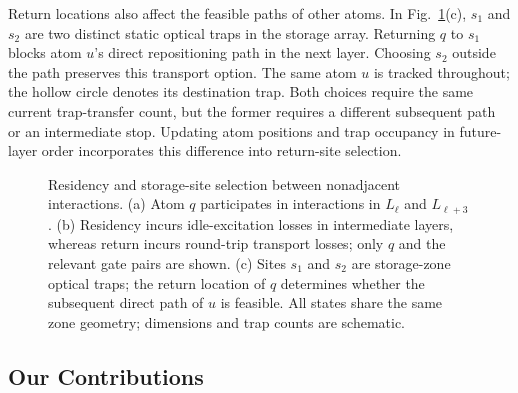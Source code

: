 Return locations also affect the feasible paths of other atoms. In Fig.~\ref{fig:baseline-motivation}(c), $s_1$ and $s_2$ are two distinct static optical traps in the storage array. Returning $q$ to $s_1$ blocks atom $u$'s direct repositioning path in the next layer. Choosing $s_2$ outside the path preserves this transport option. The same atom $u$ is tracked throughout; the hollow circle denotes its destination trap. Both choices require the same current trap-transfer count, but the former requires a different subsequent path or an intermediate stop. Updating atom positions and trap occupancy in future-layer order incorporates this difference into return-site selection.

\begin{figure}[t]
  \centering
  \resizebox{\textwidth}{!}{}
  \caption{Residency and storage-site selection between nonadjacent interactions. (a) Atom $q$ participates in interactions in $L_\ell$ and $L_{\ell+3}$. (b) Residency incurs idle-excitation losses in intermediate layers, whereas return incurs round-trip transport losses; only $q$ and the relevant gate pairs are shown. (c) Sites $s_1$ and $s_2$ are storage-zone optical traps; the return location of $q$ determines whether the subsequent direct path of $u$ is feasible. All states share the same zone geometry; dimensions and trap counts are schematic.}
  \label{fig:baseline-motivation}
\end{figure}

\subsection{Our Contributions}
\label{sec:contributions}

